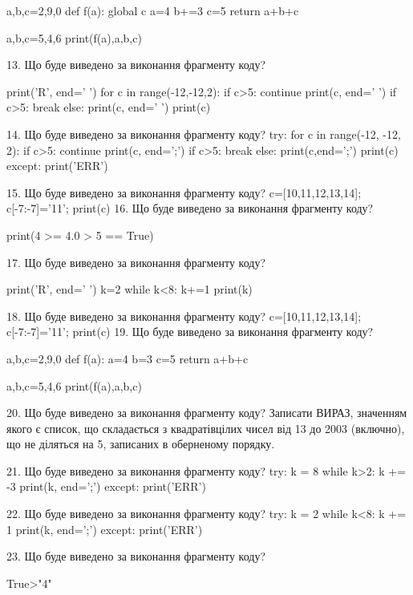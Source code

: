 \documentclass[11pt]{article}
\begin{document}
a,b,c=2,9,0
def f(a):
global c    a=4
    b+=3
    c=5
    return a+b+c

a,b,c=5,4,6
print(f(a),a,b,c)

13. Що буде виведено за виконання фрагменту коду?

print('R', end=' ')
for c in range(-12,-12,2):
    if c>5:
        continue
        print(c, end=' ')
    if c>5:
        break
    else:
        print(c, end=' ')
    print(c)

14. Що буде виведено за виконання фрагменту коду?
try:
    for c in range(-12, -12, 2):
        if c>5:
            continue
        print(c, end=';')
        if c>5:
            break
    else:
        print(c,end=';')
    print(c)
except:
    print('ERR')

15. Що буде виведено за виконання фрагменту коду?
c=[10,11,12,13,14]; c[-7:-7]='11'; print(c)
16. Що буде виведено за виконання фрагменту коду?

print(4 >= 4.0 > 5 == True)

17. Що буде виведено за виконання фрагменту коду?

print('R', end=' ')
k=2
while k<8:
    k+=1
print(k)


18. Що буде виведено за виконання фрагменту коду?
c=[10,11,12,13,14]; c[-7:-7]='11'; print(c)
19. Що буде виведено за виконання фрагменту коду?

a,b,c=2,9,0
def f(a):
    a=4
    b=3
    c=5
    return a+b+c

a,b,c=5,4,6
print(f(a),a,b,c)

20. Що буде виведено за виконання фрагменту коду?
Записати ВИРАЗ, значенням якого є список, що складається з квадратівцілих чисел від 13 до 2003 (включно), що не діляться на 5, записаних в обернено\-му порядку.

21. Що буде виведено за виконання фрагменту коду?
try:
    k = 8
    while k>2:
        k += -3
    print(k, end=';')
except:
    print('ERR')

22. Що буде виведено за виконання фрагменту коду?
try:
    k = 2
    while k<8:
        k += 1
    print(k, end=';')
except:
    print('ERR')

23. Що буде виведено за виконання фрагменту коду?

True>"4"
\end{document}
